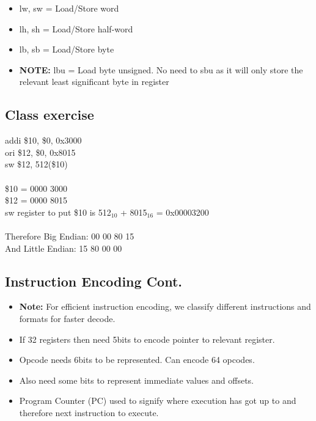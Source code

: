 \documentclass{article}
\newcommand\tab[1][0.5cm]{\hspace*{#1}}
\begin{document}
		\begin{itemize}
			\item lw, sw = Load/Store word
			\item lh, sh = Load/Store half-word
			\item lb, sb = Load/Store byte
			\item \textbf{NOTE: } 	lbu = Load byte unsigned. No need to sbu as it will only store the relevant least significant byte in register
		\end{itemize}


	\subsection{Class exercise}
		addi \$10, \$0, 0x3000 \\
		ori \$12, \$0, 0x8015 \\
		sw \$12, 512(\$10) \\ \\
		\$10 = 0000 3000 \\
		\$12 = 0000 8015 \\
		sw register to put \$10 is 512$_{10}$ + 8015$_{16}$ = 0x00003200 \\\\
		Therefore Big Endian: \tab 00 00 80 15 \\
		And Little Endian: \tab \tab 15 80 00 00

	\subsection{Instruction Encoding Cont.}
		\begin{itemize}
			\item \textbf{Note: } For efficient instruction encoding, we classify different instructions and formats for faster decode.
			\item If 32 registers then need 5bits to encode pointer to relevant register.
			\item Opcode needs 6bits to be represented. Can encode 64 opcodes.
			\item Also need some bits to represent immediate values and offsets.
			\item Program Counter (PC) used to signify where execution has got up to and therefore next instruction to execute.
			
		\end{itemize}
\end{document}
